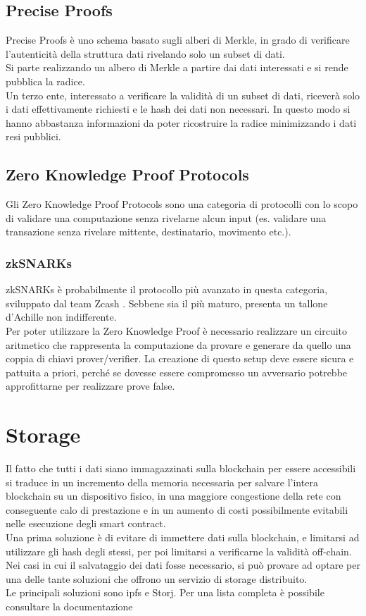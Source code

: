 \subsection{Precise Proofs}
Precise Proofs è uno schema basato sugli alberi di Merkle, in grado di verificare l'autenticità della struttura dati rivelando solo un subset di dati. \\
Si parte realizzando un albero di Merkle a partire dai dati interessati e si rende pubblica la radice. \\
Un terzo ente, interessato a verificare la validità di un subset di dati, riceverà solo i dati effettivamente richiesti e le hash dei dati non necessari.
In questo modo si hanno abbastanza informazioni da poter ricostruire la radice minimizzando i dati resi pubblici.

\subsection{Zero Knowledge Proof Protocols}
Gli Zero Knowledge Proof Protocols sono una categoria di protocolli con lo scopo di validare una computazione senza rivelarne alcun input (es. validare una transazione senza rivelare mittente, destinatario, movimento etc.).

\subsubsection{zkSNARKs}
zkSNARKs è probabilmente il protocollo più avanzato in questa categoria, sviluppato dal team Zcash \cite{wiki:zkSNARKs}.
Sebbene sia il più maturo, presenta un tallone d'Achille non indifferente. \\
Per poter utilizzare la Zero Knowledge Proof è necessario realizzare un circuito aritmetico che rappresenta la computazione da provare e generare da quello una coppia di chiavi prover/verifier.
La creazione di questo setup deve essere sicura e pattuita a priori, perché se dovesse essere compromesso un avversario potrebbe approfittarne per realizzare prove false.


\section{Storage}
Il fatto che tutti i dati siano immagazzinati sulla blockchain per essere accessibili si traduce in un incremento della memoria necessaria per salvare l'intera blockchain su un dispositivo fisico, 
in una maggiore congestione della rete con conseguente calo di prestazione e in un aumento di costi possibilmente evitabili nelle esecuzione degli smart contract. \\
Una prima soluzione è di evitare di immettere dati sulla blockchain, e limitarsi ad utilizzare gli hash degli stessi, per poi limitarsi a verificarne la validità off-chain. \\
Nei casi in cui il salvataggio dei dati fosse necessario, si può provare ad optare per una delle tante soluzioni che offrono un servizio di storage distribuito. \\
Le principali soluzioni sono \gls{ipfs} e Storj.
Per una lista completa è possibile consultare la documentazione \cite{wiki:ew-storage}

